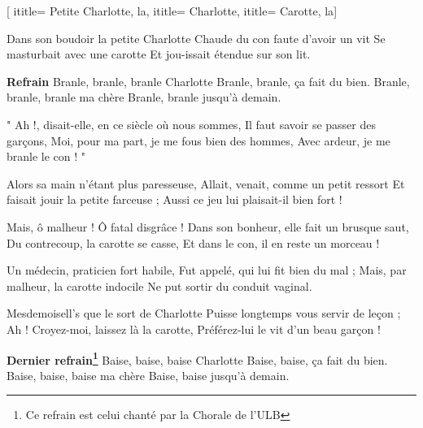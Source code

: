  [
ititle= {Petite Charlotte, la},
ititle= {Charlotte},
ititle= {Carotte, la}]


\beginverse
Dans son boudoir la petite Charlotte
Chaude du con faute d'avoir un vit
Se masturbait avec une carotte
Et jou-issait étendue sur son lit.
\endverse

\beginchorus
\textbf {Refrain}
Branle, branle, branle Charlotte
Branle, branle, ça fait du bien.
Branle, branle, branle ma chère
Branle, branle jusqu'à demain.
\endchorus

\beginverse
" Ah !, disait-elle, en ce siècle où nous sommes,
Il faut savoir se passer des garçons,
Moi, pour ma part, je me fous bien des hommes,
Avec ardeur, je me branle le con ! "
\endverse

\beginverse
Alors sa main n'étant plus paresseuse,
Allait, venait, comme un petit ressort
Et faisait jouir la petite farceuse ;
Aussi ce jeu lui plaisait-il bien fort !
\endverse

\beginverse
Mais, ô malheur ! Ô fatal disgrâce !
Dans son bonheur, elle fait un brusque saut,
Du contrecoup, la carotte se casse,
Et dans le con, il en reste un morceau !
\endverse

\beginverse
Un médecin, praticien fort habile,
Fut appelé, qui lui fit bien du mal ;
Mais, par malheur, la carotte indocile
Ne put sortir du conduit vaginal.
\endverse

\beginverse
Mesdemoisell's que le sort de Charlotte
Puisse longtemps vous servir de leçon ;
Ah ! Croyez-moi, laissez là la carotte,
Préférez-lui le vit d'un beau garçon !
\endverse

\beginchorus
\textbf {Dernier refrain\footnote{Ce refrain est celui chanté par la Chorale de l'ULB }}
Baise, baise, baise Charlotte
Baise, baise, ça fait du bien.
Baise, baise, baise ma chère
Baise, baise jusqu'à demain.
\endchorus

\endsong